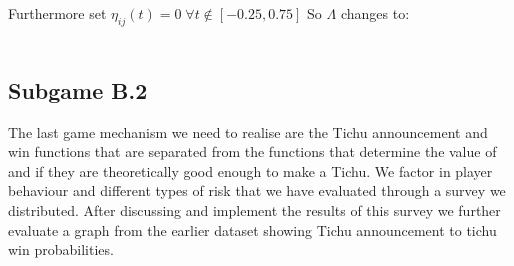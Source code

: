 Furthermore set $\eta_{ij}(t)=0\;\forall t\not\in [-0.25, 0.75]$
So $\Lambda$ changes to:
\\ \\
\noindent{}

\subsection{Subgame B.2}
The last game mechanism we need to realise are the Tichu announcement and win functions that are separated from the functions that determine the value of and if they are theoretically good enough to make a Tichu. We factor in player behaviour and different types of risk that we have evaluated through a survey we distributed. After discussing and  implement the results of  this survey we further evaluate a graph from the earlier dataset showing Tichu announcement to tichu win probabilities. 

